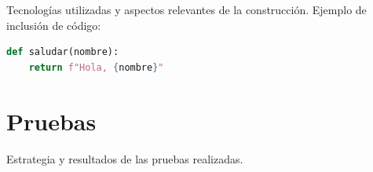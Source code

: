 Tecnologías utilizadas y aspectos relevantes de la construcción. Ejemplo de
inclusión de código:

\begin{lstlisting}[language=Python,caption={Ejemplo de fragmento de código}]
def saludar(nombre):
    return f"Hola, {nombre}"
\end{lstlisting}

\section{Pruebas}

Estrategia y resultados de las pruebas realizadas.
